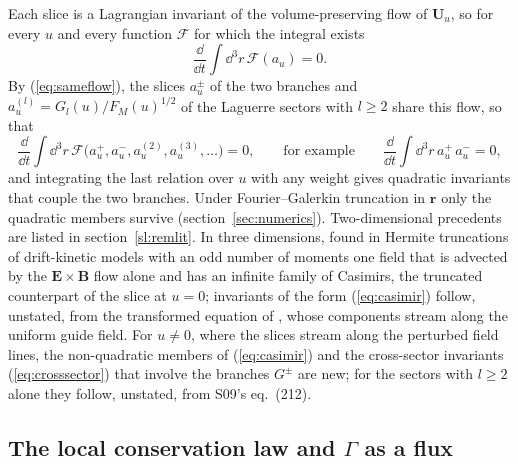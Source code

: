 Each slice is a Lagrangian invariant of the volume-preserving flow of $\boldsymbol U_u$, so for every $u$ and every function $\mathcal F$ for which the integral exists
\begin{equation}\label{eq:casimir}
  \frac{\dd}{\dd t}\int\dd^3r\,\mathcal F(a_u)=0 .
\end{equation}
By (\ref{eq:sameflow}), the slices $a^\pm_u$ of the two branches and $a^{(l)}_u=G_l(u)/F_M(u)^{1/2}$ of the Laguerre sectors with $l\ge2$ share this flow, so that
\begin{equation}\label{eq:crosssector}
  \frac{\dd}{\dd t}\int\dd^3r\,\mathcal F\big(a^+_u,a^-_u,a^{(2)}_u,a^{(3)}_u,\dots\big)=0,\qquad\text{for example}\qquad\frac{\dd}{\dd t}\int\dd^3r\,a^+_u\,a^-_u=0,
\end{equation}
and integrating the last relation over $u$ with any weight gives quadratic invariants that couple the two branches. Under Fourier--Galerkin truncation in $\boldsymbol r$ only the quadratic members survive (section~\ref{sec:numerics}). Two-dimensional precedents are listed in section~\ref{sl:remlit}. In three dimensions, \citet{Tassi2022} found in Hermite truncations of drift-kinetic models with an odd number of moments one field that is advected by the $\boldsymbol E\times\boldsymbol B$ flow alone \citep[see also][\S3.4]{Tassi2023} and has an infinite family of Casimirs, the truncated counterpart of the slice at $u=0$; invariants of the form (\ref{eq:casimir}) follow, unstated, from the transformed equation of \citet{Heninger2018}, whose components stream along the uniform guide field. For $u\neq0$, where the slices stream along the perturbed field lines, the non-quadratic members of (\ref{eq:casimir}) and the cross-sector invariants (\ref{eq:crosssector}) that involve the branches $G^\pm$ are new; for the sectors with $l\ge2$ alone they follow, unstated, from S09's eq.~(212).

\subsection{The local conservation law and \texorpdfstring{$\Gamma$}{Gamma} as a flux}\label{inv:flux}

